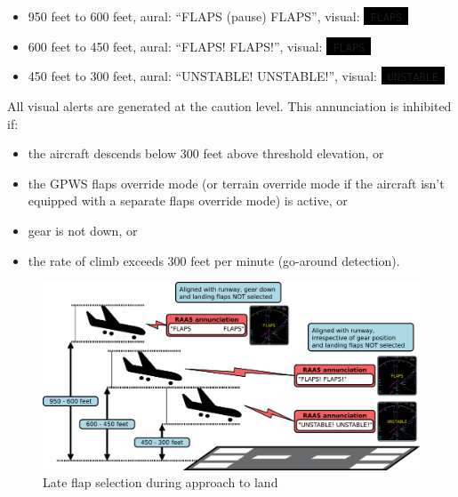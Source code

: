 \documentclass[a4paper,12pt]{article}
\newcommand{\visualadvisory}[3][b]{%
    \ifthenelse{\equal{#1}{b}}{\begin{center}}{}
    \noindent
    \colorbox{black}{\textcolor{#2visualadvisorycolor}{\large\texttt{~#3~}}}
    \ifthenelse{\equal{#1}{b}}{\end{center}}{}}
\begin{document}
\begin{itemize}

\item 950 feet to 600 feet, aural: ``FLAPS (pause) FLAPS'',
visual:\visualadvisory[i]{nonroutine}{FLAPS}

\item 600 feet to 450 feet, aural: ``FLAPS! FLAPS!'',
visual:\visualadvisory[i]{nonroutine}{FLAPS}

\item 450 feet to 300 feet, aural: ``UNSTABLE! UNSTABLE!'',
visual:\visualadvisory[i]{nonroutine}{UNSTABLE}

\end{itemize}

\noindent All visual alerts are generated at the caution level. This
annunciation is inhibited if:

\begin{itemize}

\item the aircraft descends below 300 feet above threshold elevation, or

\item the GPWS flaps override mode (or terrain override mode if the
aircraft isn't equipped with a separate flaps override mode) is active,
or

\item gear is not down, or

\item the rate of climb exceeds 300 feet per minute (go-around
detection).

\end{itemize}

\begin{figure}[H]
\begin{center}
\includegraphics[width=\textwidth]{../src/apch_flaps.pdf}
\end{center}
\caption{Late flap selection during approach to land}
\end{figure}
\end{document}
